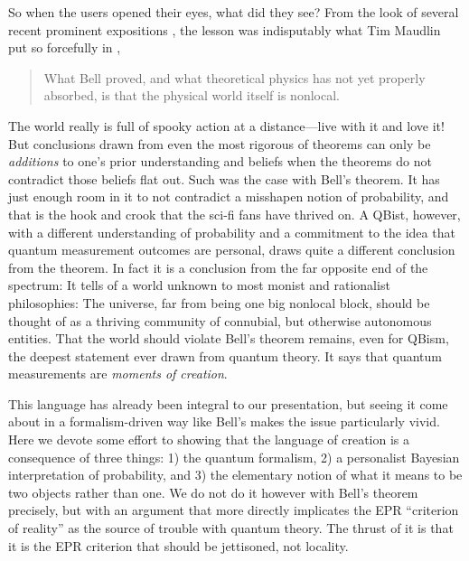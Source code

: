\documentclass[aps,pra,superscriptaddress,12pt,tightenlines,nofootinbib]{revtex4-2}
\begin{document}
So when the users opened their eyes, what did they see?  From the look of several recent prominent expositions \cite{Gisin09,Albert09,Norsen06}, the lesson was indisputably what Tim Maudlin put so forcefully in \cite{Maudlin14},
\begin{quote}
What Bell proved, and what theoretical physics
has not yet properly absorbed, is that the physical
world itself is nonlocal.
\end{quote}
The world really is full of spooky action at a distance---live with it and love it!  But conclusions drawn from even the most rigorous of theorems can only be {\it additions\/} to one's prior understanding and beliefs when the theorems do not contradict those beliefs flat out.  Such was the case with Bell's theorem.  It has just enough room in it to not contradict a misshapen notion of probability, and that is the hook and crook that the sci-fi fans have thrived on.  A QBist, however, with a different understanding of probability and a commitment to the idea that quantum measurement outcomes are personal, draws quite a different conclusion from the theorem.  In fact it is a conclusion from the far opposite end of the spectrum:  It tells of a world unknown to most monist and rationalist philosophies:  The universe, far from being one big nonlocal block, should be thought of as a thriving community of connubial, but otherwise autonomous entities.   That the world should violate Bell's theorem remains, even for QBism, the deepest statement ever drawn from quantum theory.  It says that quantum measurements are {\it moments of creation}.

This language has already been integral to our presentation, but seeing it come about in a formalism-driven way like Bell's makes the issue particularly vivid.  Here we devote some effort to showing that the language of creation is a consequence of three things:  1) the quantum formalism, 2) a personalist Bayesian interpretation of probability, and 3) the elementary notion of what it means to be two objects rather than one.  We do not do it however with Bell's theorem precisely, but with an argument that more directly implicates the EPR ``criterion of reality'' as the source of trouble with quantum theory.  The thrust of it is that it is the EPR criterion that should be jettisoned, not locality.
\end{document}
